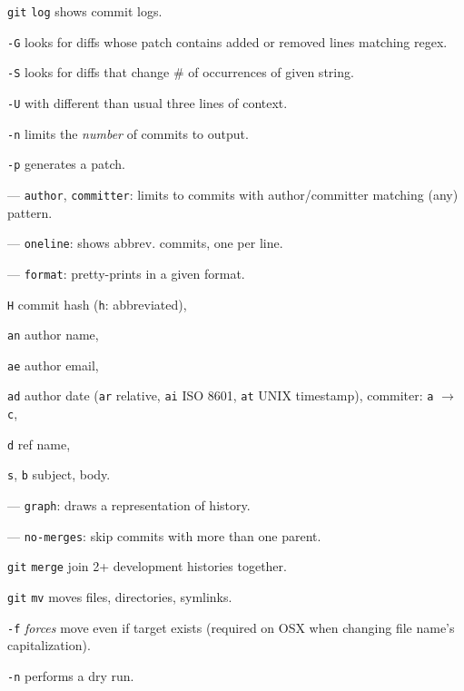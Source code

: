 \documentclass{reference_card}
\begin{document}
\begin{multicols*}{3}
\begin{compactenum}
\item [\texttt{git}] \texttt{log} shows commit logs.
\item [\texttt{-G}] looks for diffs whose patch contains added or removed lines matching regex.
\item [\texttt{-S}] looks for diffs that change \# of occurrences of given string.
\item [\texttt{-U}] with different than usual three lines of context.
\item [\texttt{-n}] limits the \emph{number} of commits to output.
\item [\texttt{-p}] generates a patch.
\item [---] \texttt{author}, \texttt{committer}: limits to commits with author/committer matching (any) pattern.
\item [---] \texttt{oneline}: shows abbrev. commits, one per line.
\item [---] \texttt{format}: pretty-prints in a given format.
\begin{compactenum}
\item [\texttt{H}] commit hash (\texttt{h}: abbreviated),
\item [\texttt{an}] author name,
\item [\texttt{ae}] author email,
\item [\texttt{ad}] author date (\texttt{ar} relative, \texttt{ai} ISO 8601, \texttt{at} UNIX timestamp), commiter: \texttt{a} $\to$ \texttt{c},
\item [\texttt{d}] ref name,
\item [\texttt{s}, \texttt{b}] subject, body.
\end{compactenum}
\item [---] \texttt{graph}: draws a representation of history.
\item [---] \texttt{no-merges}: skip commits with more than one parent.
\end{compactenum}

\begin{compactenum}
\item [\texttt{git}] \texttt{merge} join 2+ development histories together.
\end{compactenum}

\begin{compactenum}
\item [\texttt{git}] \texttt{mv} moves files, directories, symlinks.
\item [\texttt{-f}] \emph{forces} move even if target exists (required on OSX when changing file name's capitalization).
\item [\texttt{-n}] performs a dry run.
\end{compactenum}


\end{multicols*}
\end{document}

